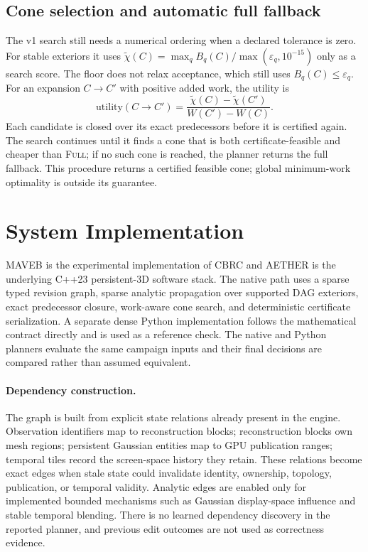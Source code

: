 \documentclass[acmtog,nonacm]{acmart}
\newcommand{\method}{CBRC}
\newcommand{\system}{MAVEB}
\newcommand{\platform}{AETHER}
\newcommand{\FULL}{\textsc{Full}}
\begin{document}
\subsection{Cone selection and automatic full fallback}
The v1 search still needs a numerical ordering when a declared tolerance is zero. For stable exteriors it uses $\tilde\chi(C)=\max_q B_q(C)/\max(\varepsilon_q,10^{-15})$ only as a search score. The floor does not relax acceptance, which still uses $B_q(C)\le\varepsilon_q$. For an expansion $C\rightarrow C'$ with positive added work, the utility is
\begin{equation}
\mathrm{utility}(C\rightarrow C')=
\frac{\tilde\chi(C)-\tilde\chi(C')}{W(C')-W(C)}.
\label{eq:utility}
\end{equation}
Each candidate is closed over its exact predecessors before it is certified again. The search continues until it finds a cone that is both certificate-feasible and cheaper than \FULL{}; if no such cone is reached, the planner returns the full fallback. This procedure returns a certified feasible cone; global minimum-work optimality is outside its guarantee.

\section{System Implementation}
\system{} is the experimental implementation of \method{} and \platform{} is the underlying C++23 persistent-3D software stack. The native path uses a sparse typed revision graph, sparse analytic propagation over supported DAG exteriors, exact predecessor closure, work-aware cone search, and deterministic certificate serialization. A separate dense Python implementation follows the mathematical contract directly and is used as a reference check. The native and Python planners evaluate the same campaign inputs and their final decisions are compared rather than assumed equivalent.

\paragraph{Dependency construction.}
The graph is built from explicit state relations already present in the engine. Observation identifiers map to reconstruction blocks; reconstruction blocks own mesh regions; persistent Gaussian entities map to GPU publication ranges; temporal tiles record the screen-space history they retain. These relations become exact edges when stale state could invalidate identity, ownership, topology, publication, or temporal validity. Analytic edges are enabled only for implemented bounded mechanisms such as Gaussian display-space influence and stable temporal blending. There is no learned dependency discovery in the reported planner, and previous edit outcomes are not used as correctness evidence.
\end{document}
